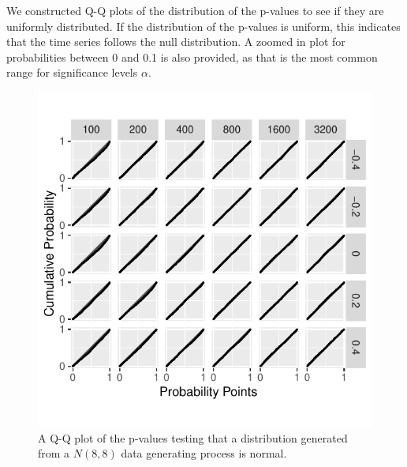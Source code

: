 \documentclass[12pt, letterpaper]{article}
\begin{document}
We constructed Q-Q plots of the distribution of the p-values to see if they are
uniformly distributed. If the distribution of the p-values is uniform, this 
indicates that the time series follows the null distribution. 
A zoomed in plot for probabilities between 0 and 0.1 is
also provided, as
that is the most common range for significance levels $\alpha$. 

\begin{figure}[tbp]
  \centering
  \includegraphics[scale=1]{figures/normal}
  \caption{A Q-Q plot of the p-values testing that a distribution
  generated from a $N(8,8)$ data generating process is normal.}
  \label{fig:normal}
\end{figure}
\end{document}
